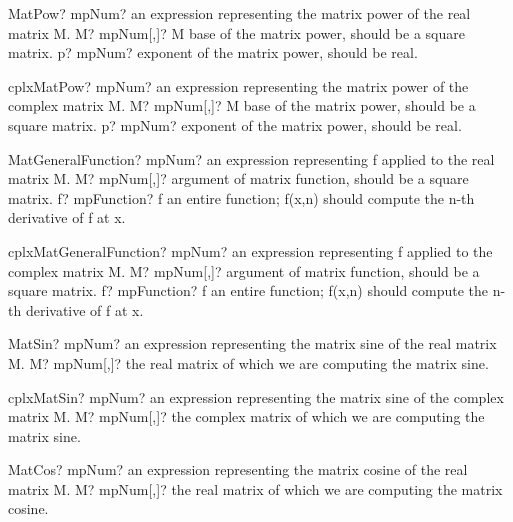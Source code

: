 \documentclass[12pt,a4paper,openany]{book}
\begin{document}
\begin{mpFunctionsExtract}
\mpFunctionTwo
{MatPow? mpNum? an expression representing the matrix power of the real matrix M.}
{M? mpNum[,]? M base of the matrix power, should be a square matrix.}
{p? mpNum? exponent of the matrix power, should be real.}
\end{mpFunctionsExtract}

\begin{mpFunctionsExtract}
\mpFunctionTwo
{cplxMatPow? mpNum? an expression representing the matrix power of the complex matrix M.}
{M? mpNum[,]? M base of the matrix power, should be a square matrix.}
{p? mpNum? exponent of the matrix power, should be real.}
\end{mpFunctionsExtract}

\begin{mpFunctionsExtract}
\mpFunctionTwo
{MatGeneralFunction? mpNum? an expression representing f applied to the real matrix M.}
{M? mpNum[,]? argument of matrix function, should be a square matrix.}
{f? mpFunction? f an entire function; f(x,n) should compute the n-th derivative of f at x.}
\end{mpFunctionsExtract}

\begin{mpFunctionsExtract}
\mpFunctionTwo
{cplxMatGeneralFunction? mpNum? an expression representing f applied to the complex matrix M.}
{M? mpNum[,]? argument of matrix function, should be a square matrix.}
{f? mpFunction? f an entire function; f(x,n) should compute the n-th derivative of f at x.}
\end{mpFunctionsExtract}

\begin{mpFunctionsExtract}
\mpFunctionOne
{MatSin? mpNum? an expression representing the matrix sine of the real matrix M.}
{M? mpNum[,]? the real matrix of which we are computing the matrix sine.}
\end{mpFunctionsExtract}

\begin{mpFunctionsExtract}
\mpFunctionOne
{cplxMatSin? mpNum? an expression representing the matrix sine of the complex matrix M.}
{M? mpNum[,]? the complex matrix of which we are computing the matrix sine.}
\end{mpFunctionsExtract}

\begin{mpFunctionsExtract}
\mpFunctionOne
{MatCos? mpNum? an expression representing the matrix cosine of the real matrix M.}
{M? mpNum[,]? the real matrix of which we are computing the matrix cosine.}
\end{mpFunctionsExtract}
\end{document}
